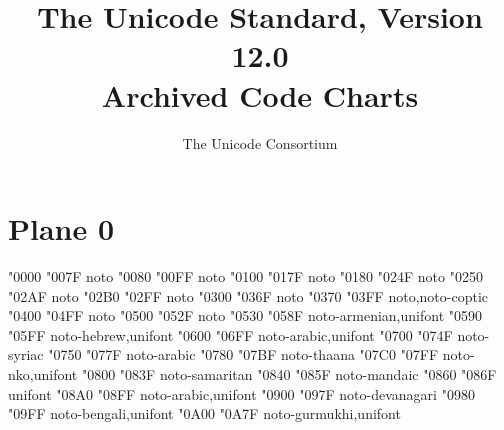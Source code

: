 \documentclass{article}
\title{The Unicode Standard, Version 12.0\\
  Archived Code Charts}
\author{The Unicode Consortium}
\begin{document}
\maketitle
\tableofcontents

\section{Plane 0}

                    {  "0000} {  "007F} {noto}
             {  "0080} {  "00FF} {noto}
                               {  "0100} {  "017F} {noto}
                               {  "0180} {  "024F} {noto}
                                 {  "0250} {  "02AF} {noto}
                       {  "02B0} {  "02FF} {noto}
                    {  "0300} {  "036F} {noto}
                               {  "0370} {  "03FF} {noto,noto-coptic}
                                       {  "0400} {  "04FF} {noto}
                            {  "0500} {  "052F} {noto}
                                       {  "0530} {  "058F} {noto-armenian,unifont}
                                         {  "0590} {  "05FF} {noto-hebrew,unifont}
                                         {  "0600} {  "06FF} {noto-arabic,unifont}
                                         {  "0700} {  "074F} {noto-syriac}
                              {  "0750} {  "077F} {noto-arabic}
                                         {  "0780} {  "07BF} {noto-thaana}
                                            {  "07C0} {  "07FF} {noto-nko,unifont}
                                      {  "0800} {  "083F} {noto-samaritan}
                                        {  "0840} {  "085F} {noto-mandaic}
                              {  "0860} {  "086F} {unifont}
                              {  "08A0} {  "08FF} {noto-arabic,unifont}
                                     {  "0900} {  "097F} {noto-devanagari}
                                        {  "0980} {  "09FF} {noto-bengali,unifont}
                                       {  "0A00} {  "0A7F} {noto-gurmukhi,unifont}
\end{document}
